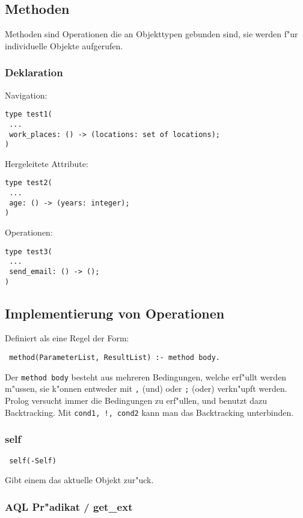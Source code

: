 \documentclass[german, 10pt, a4paper, twocolumn]{scrartcl}
\theoremstyle{definition}
\theoremstyle{remark}
\theoremstyle{example}
\begin{document}
\subsection{Methoden}

Methoden sind Operationen die an Objekttypen gebunden sind, sie werden f"ur individuelle Objekte aufgerufen.

\subsubsection{Deklaration}

Navigation:
\begin{verbatim}
type test1(
 ...
 work_places: () -> (locations: set of locations);
)
\end{verbatim}

Hergeleitete Attribute:
\begin{verbatim}
type test2(
 ...
 age: () -> (years: integer);
)
\end{verbatim}

Operationen:
\begin{verbatim}
type test3(
 ...
 send_email: () -> ();
)
\end{verbatim}

\subsection{Implementierung von Operationen}

Definiert als eine Regel der Form:
\begin{verbatim}
 method(ParameterList, ResultList) :- method body.
\end{verbatim}

Der \texttt{method body} besteht aus mehreren Bedingungen, welche erf"ullt werden m"ussen, sie k"onnen entweder mit \texttt{,} (und) oder \texttt{;} (oder) verkn"upft werden. Prolog versucht immer die Bedingungen zu erf"ullen, und benutzt dazu Backtracking. Mit \texttt{cond1, !, cond2} kann man das Backtracking unterbinden.

\subsubsection{self}

\begin{verbatim}
 self(-Self)
\end{verbatim}

Gibt einem das aktuelle Objekt zur"uck.

\subsubsection{AQL Pr"adikat / get\_ext}
\end{document}

